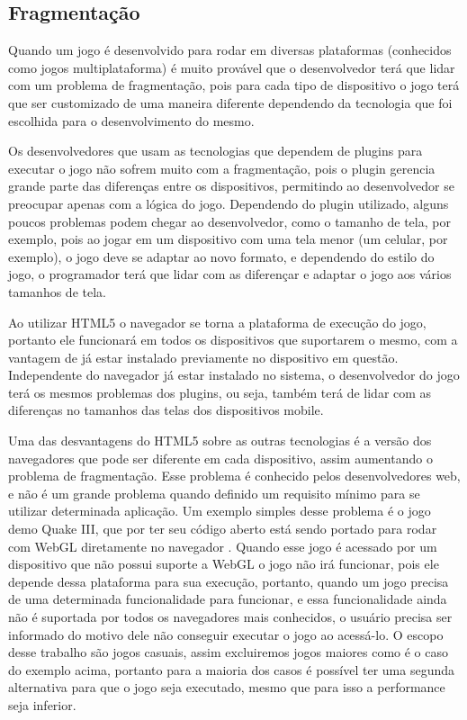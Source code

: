\subsection{Fragmentação}

Quando um jogo é desenvolvido para rodar em diversas plataformas
(conhecidos como jogos multiplataforma) é muito provável que o
desenvolvedor terá que lidar com um problema de fragmentação, pois
para cada tipo de dispositivo o jogo terá que ser customizado de uma
maneira diferente dependendo da tecnologia que foi escolhida para o
desenvolvimento do mesmo.

Os desenvolvedores que usam as tecnologias que dependem de plugins para executar o
jogo não sofrem muito com a fragmentação, pois o plugin gerencia
grande parte das diferenças entre os dispositivos, permitindo ao
desenvolvedor se preocupar apenas com a lógica do jogo. Dependendo do
plugin utilizado, alguns poucos problemas podem chegar ao
desenvolvedor, como o tamanho de tela, por exemplo, pois ao jogar em
um dispositivo com uma tela menor (um celular, por exemplo), o jogo
deve se adaptar ao novo formato, e dependendo do estilo do jogo, o
programador terá que lidar com as diferençar e adaptar o jogo aos
vários tamanhos de tela.

Ao utilizar HTML5 o navegador se torna a plataforma de execução do
jogo, portanto ele funcionará em todos os dispositivos que
suportarem o mesmo, com a vantagem de já estar instalado previamente
no dispositivo em questão.
Independente do navegador já estar instalado no sistema, o
desenvolvedor do jogo terá os mesmos problemas dos plugins, ou seja,
também terá de lidar com as diferenças no tamanhos das telas dos
dispositivos mobile.

Uma das desvantagens do HTML5 sobre as outras tecnologias é a versão
dos navegadores que pode ser diferente em cada dispositivo, assim
aumentando o problema de fragmentação. Esse problema é conhecido pelos
desenvolvedores web, e não é um grande problema quando definido um
requisito mínimo para se utilizar determinada aplicação. Um exemplo
simples desse problema é o jogo demo Quake III, que por ter seu código
aberto está sendo portado para rodar com WebGL diretamente no navegador
\cite{website:webglquake3}. Quando esse jogo é acessado por um
dispositivo que não possui suporte a WebGL o jogo não irá funcionar,
pois ele depende dessa plataforma para sua execução, portanto, quando
um jogo precisa de uma determinada funcionalidade para funcionar, e
essa funcionalidade ainda não é suportada por todos os navegadores
mais conhecidos, o usuário precisa ser informado do motivo dele não
conseguir executar o jogo ao acessá-lo.
O escopo desse trabalho são jogos casuais, assim excluiremos jogos
maiores como é o caso do exemplo acima, portanto para a maioria dos
casos é possível ter uma segunda alternativa para que o jogo seja
executado, mesmo que para isso a performance seja inferior.

